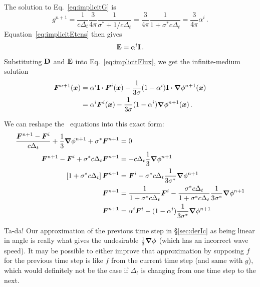 The solution to Eq.~\eqref{eq:implicitG} is
\begin{equation*}
  g^{n+1}
  = \frac{1}{c \Delta_t} \frac{3}{4\pi} \frac{1}{\sigma^\ast + 1 /c \Delta_t}
  = \frac{3}{4\pi} \frac{1}{1 + \sigma^\ast c \Delta_t}
  = \frac{3}{4\pi} \alpha^i \,.
\end{equation*}
Equation~\eqref{eq:implicitEtens} then gives
\begin{equation*}
  \mathbf{E} = \alpha^i \mathbf{I}\,.
\end{equation*}

Substituting $\mathbf{D}$ and $\mathbf{E}$ into Eq.~\eqref{eq:implicitFlux}, we get the
infinite-medium solution
\begin{align*}
  \bm{F}^{n+1}(\bm{x})
  &= \alpha^i \mathbf{I} \bm{\cdot} \bm{F}^i(\bm{x})
  - \frac{1}{3 \sigma} ( 1 - \alpha^i) \mathbf{I} \bm{\cdot} \bm{\nabla} \phi^{n+1} (\bm{x}) 
  \\
  &= \alpha^i \bm{F}^i(\bm{x})
  - \frac{1}{3 \sigma} ( 1 - \alpha^i) \bm{\nabla} \phi^{n+1} (\bm{x})\,.
\end{align*}

We can reshape the \Pone\ equations into this exact form:
\begin{align*}
  \frac{\bm{F}^{n+1} - \bm{F}^i}{c \Delta_t} + \frac{1}{3} \bm{\nabla} \phi^{n+1}
  + \sigma^\ast \bm{F}^{n+1} &= 0
  \\
  \bm{F}^{n+1} - \bm{F}^i 
  + \sigma^\ast c \Delta_t \bm{F}^{n+1}
  &= - c \Delta_t \frac{1}{3} \bm{\nabla} \phi^{n+1}
  \\
  \left[ 1 + \sigma^\ast c \Delta_t \right] \bm{F}^{n+1}
  &= \bm{F}^i - \sigma^\ast c \Delta_t \frac{1}{3\sigma^\ast} \bm{\nabla} \phi^{n+1}
  \\
  \bm{F}^{n+1}
  &= \frac{1}{1 + \sigma^\ast c \Delta_t} \bm{F}^i - \frac{\sigma^\ast c
  \Delta_t}{1 + \sigma^\ast c \Delta_t} \frac{1}{3\sigma^\ast} \bm{\nabla} \phi^{n+1}
  \\
  \bm{F}^{n+1}
  &= \alpha^i \bm{F}^i - (1 - \alpha^i) \frac{1}{3\sigma^\ast} \bm{\nabla} \phi^{n+1}
\end{align*}

Ta-da! Our approximation of the previous time step in \S\ref{sec:derIc} as
being linear in angle is really what gives the undesirable $\frac13\bm{\nabla}\phi$
(which has an incorrect wave speed). It may be possible to either improve that
approximation by supposing $f$ for the previous time step is like $f$ from the
current time step (and same with $g$), which would definitely not be the case
if $\Delta_t$ is changing from one time step to the next.


